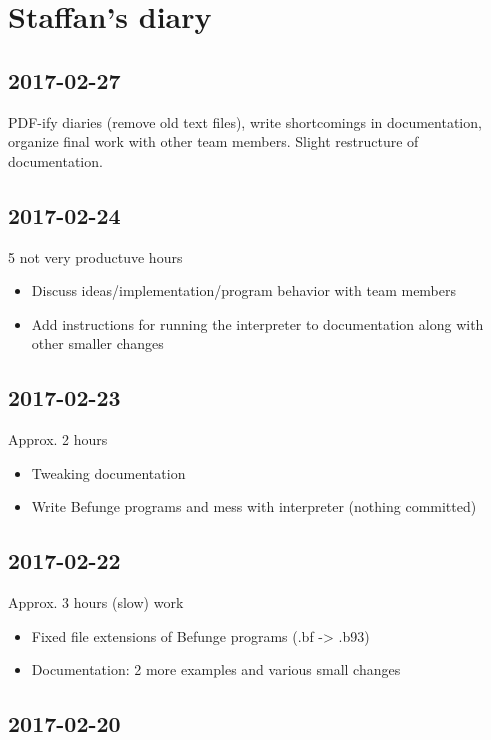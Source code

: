 \documentclass[12pt, a4paper]{article}
\begin{document}
\section*{Staffan's diary}

\subsection*{2017-02-27}

PDF-ify diaries (remove old text files), write shortcomings in documentation, organize final work with other team members. Slight restructure of documentation.

\subsection*{2017-02-24}

5 not very productuve hours

\begin{itemize}
\item Discuss ideas/implementation/program behavior with team members
\item Add instructions for running the interpreter to documentation along with other smaller changes
\end{itemize}

\subsection*{2017-02-23}

Approx. 2 hours
\begin{itemize}
\item Tweaking documentation
\item Write Befunge programs and mess with interpreter (nothing committed)
\end{itemize}

\subsection*{2017-02-22}

Approx. 3 hours (slow) work
\begin{itemize}
\item Fixed file extensions of Befunge programs (.bf -> .b93)
\item Documentation: 2 more examples and various small changes
\end{itemize}

\subsection*{2017-02-20}
\end{document}
